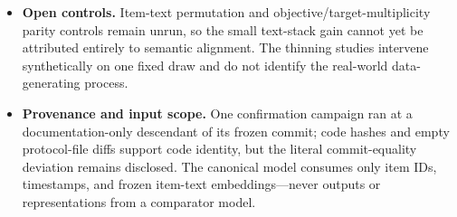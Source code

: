 \begin{itemize}
\item
  \textbf{Open controls.} Item-text permutation and objective/target-multiplicity parity controls remain unrun, so the small text-stack gain cannot yet be attributed entirely to semantic alignment. The thinning studies intervene synthetically on one fixed draw and do not identify the real-world data-generating process.
\item
  \textbf{Provenance and input scope.} One confirmation campaign ran at a documentation-only descendant of its frozen commit; code hashes and empty protocol-file diffs support code identity, but the literal commit-equality deviation remains disclosed. The canonical model consumes only item IDs, timestamps, and frozen item-text embeddings---never outputs or representations from a comparator model.
\end{itemize}
